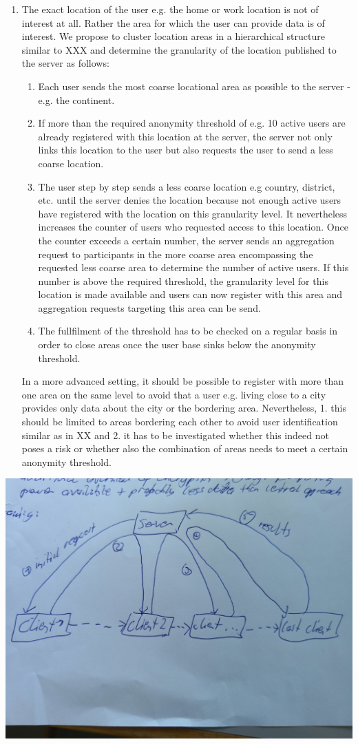  \begin{enumerate}
 	\item The exact location of the user e.g. the home or work location is not of interest at all. Rather the area for which the user can provide data is of interest. We propose to cluster location areas in a hierarchical structure similar to XXX and determine the granularity of the location published to the server as follows:
 	\begin{enumerate}
 		\item Each user sends the most coarse locational area as possible to the server - e.g. the continent.
 		\item If more than the required anonymity threshold of e.g. 10 active users are already registered with this location at the server, the server not only links this location to the user but also requests the user to send a less coarse location.
 		\item The user step by step sends a less coarse location e.g country, district, etc. until the server denies the location because not enough active users have registered with the location on this granularity level. It nevertheless increases the counter of users who requested access to this location. Once the counter exceeds a certain number, the server sends an aggregation request to participants in the more coarse area encompassing the requested less coarse area to determine the number of active users. If this number is above the required threshold, the granularity level for this location is made available and users can now register with this area and aggregation requests targeting this area can be send.
 		\item The fullfilment of the threshold has to be checked on a regular basis in order to close areas once the user base sinks below the anonymity threshold.
 	\end{enumerate}
 	In a more advanced setting, it should be possible to register with more than one area on the same level to avoid that a user e.g. living close to a city provides only data about the city or the bordering area. Nevertheless, 1. this should be limited to areas bordering each other to avoid user identification similar as in XX and 2. it has to be investigated whether this indeed not poses a risk or whether also the combination of areas needs to meet a certain anonymity threshold.
 \end{enumerate}

\includegraphics[width=\textwidth]{data/concept.jpg}

